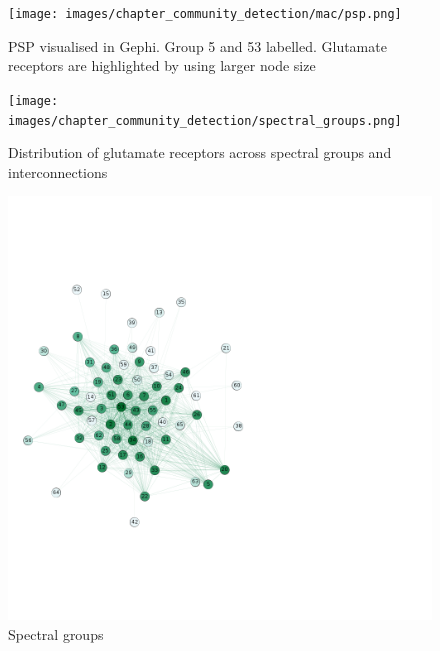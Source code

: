 
\begin{figure}
    \centering
    \texttt{[image: images/chapter\_community\_detection/mac/psp.png]}
    \caption{PSP visualised in Gephi. Group 5 and 53 labelled. Glutamate receptors are highlighted by using larger node size}
    \label{fig:communities_spectral}
\end{figure}



\begin{figure}
    \centering
    \texttt{[image: images/chapter\_community\_detection/spectral\_groups.png]}
    \caption{Distribution of glutamate receptors across spectral groups and interconnections}
    \label{fig:communities_spectral}
\end{figure}




\begin{figure}
    \centering
    \includegraphics[width=\textwidth]{images/chapter_community_detection/gephi/show_groups_spectral1.png}
    \caption{Spectral groups}
    \label{fig:spectral groups}
\end{figure}


